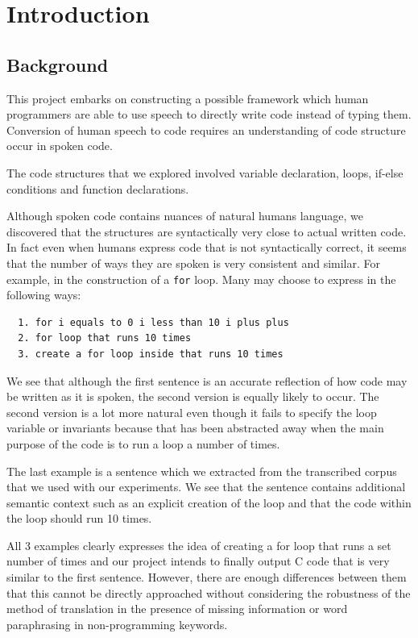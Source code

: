 \documentclass[fyp]{socreport}
\begin{document}
\listoffigures
\listoftables
\tableofcontents

\chapter{Introduction}

\section{Background}
This project embarks on constructing a possible framework which human
programmers are able to use speech to directly write code instead of typing
them. Conversion of human speech to code requires an understanding of code
structure occur in spoken code.

The code structures that we explored involved variable declaration, loops,
if-else conditions and function declarations.

Although spoken code contains nuances of natural humans language, we discovered
that the structures are syntactically very close to actual written code. In
fact even when humans express code that is not syntactically correct, it seems
that the number of ways they are spoken is very consistent and similar.  For
example, in the construction of a \texttt{for} loop. Many may choose to
express in the following ways:

\begin{verbatim}
  1. for i equals to 0 i less than 10 i plus plus
  2. for loop that runs 10 times
  3. create a for loop inside that runs 10 times
\end{verbatim}

We see that although the first sentence is an accurate reflection of how code
may be written as it is spoken, the second version is equally likely to occur.
The second version is a lot more natural even though it fails to specify the
loop variable or invariants because that has been abstracted away when the main
purpose of the code is to run a loop a number of times.

The last example is a sentence which we extracted from the transcribed corpus
that we used with our experiments. We see that the sentence contains
additional semantic context such as an explicit creation of the loop and that
the code within the loop should run 10 times.

All 3 examples clearly expresses the idea of creating a for loop that runs a
set number of times and our project intends to finally output C code that is
very similar to the first sentence. However, there are enough differences
between them that this cannot be directly approached without considering
the robustness of the method of translation in the presence of missing
information or word paraphrasing in non-programming keywords.
\end{document}
